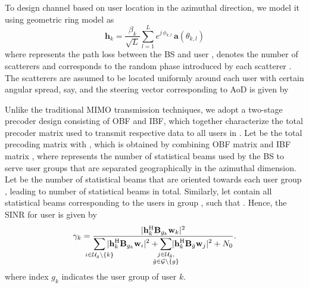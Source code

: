 \documentclass[letterpaper,conference,10pt]{IEEEtran}
\begin{document}
		To design channel based on user location in the azimuthal direction, we model it using geometric ring model \cite{Molisch2012} as
		\begin{equation}\label{icassp2}
		\mathbf{h}_k = \dfrac{\beta_k}{\sqrt{L}} \sum_{l=1}^{L} e^{j \, \phi_{k,l}} \, \mathbf{a}(\theta_{k,l})
		\end{equation}
		where  represents the path loss between the \ac{BS} and user ,  denotes the number of scatterers and  corresponds to the random phase introduced by each scatterer . The scatterers are assumed to be located uniformly around each user with certain angular spread, say,  and the steering vector  corresponding to \ac{AoD}  is given by 
		
		Unlike the traditional \ac{MIMO} transmission techniques, we adopt a two-stage precoder design consisting of \ac{OBF} and \ac{IBF}, which together characterize the total precoder matrix used to transmit respective data to all users in . %
		Let  be the total precoding matrix with , which is obtained by combining \ac{OBF} matrix  and \ac{IBF} matrix , where  represents the number of statistical beams used by the \ac{BS} to serve user groups that are separated geographically in the azimuthal dimension. Let  be the number of statistical beams that are oriented towards each user group , leading to  number of statistical beams in total. Similarly, let  contain all statistical beams corresponding to the users in group , such that . Hence, the \ac{SINR} for user  is given by
		\begin{equation}\label{icassp5}
		\textstyle \gamma_{k} = \dfrac{|\mathbf{h}_{k}^\herm \mathbf{B}_{g_k} \mathbf{w}_{k}|^2}{{\displaystyle\sum_{\mathclap{\substack{i \in \mathcal{U}_{g} \backslash \{k\}}}}| \mathbf{h}_{k}^{\herm} \mathbf{B}_{g_k} \mathbf{w}_{i} |^2 + {  \sum_{\mathclap{\substack{j \in \mathcal{U}_{\bar{g}},\\  \bar{g} \in {\mathcal{G}} \backslash \{g\}}}}} |\mathbf{h}_{k}^\herm \mathbf{B}_{\bar{g}} \mathbf{w}_{j} |^2 + N_0}}.
		\end{equation}
		where index $g_k$ indicates the user group of user $k$.
		
\end{document}
